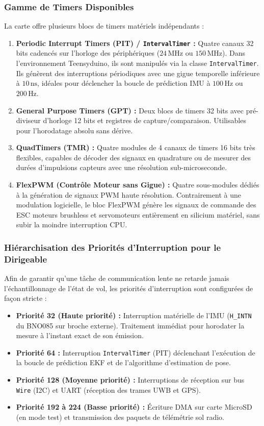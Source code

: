 \documentclass[../Materiel.tex]{subfiles}
\begin{document}
\subsubsection{Gamme de Timers Disponibles}
La carte offre plusieurs blocs de timers matériels indépendants :
\begin{enumerate}
    \item \textbf{Periodic Interrupt Timers (PIT) / \texttt{IntervalTimer} :}
    Quatre canaux 32 bits cadencés sur l'horloge des périphériques ($24\,\text{MHz}$ ou $150\,\text{MHz}$). Dans l'environnement Teensyduino, ils sont manipulés via la classe \lstinline|IntervalTimer|. Ils génèrent des interruptions périodiques avec une gigue temporelle inférieure à $10\,\text{ns}$, idéales pour déclencher la boucle de prédiction IMU à $100\,\text{Hz}$ ou $200\,\text{Hz}$.
    \item \textbf{General Purpose Timers (GPT) :}
    Deux blocs de timers 32 bits avec pré-diviseur d'horloge 12 bits et registres de capture/comparaison. Utilisables pour l'horodatage absolu sans dérive.
    \item \textbf{QuadTimers (TMR) :}
    Quatre modules de 4 canaux de timers 16 bits très flexibles, capables de décoder des signaux en quadrature ou de mesurer des durées d'impulsions capteurs avec une résolution sub-microseconde.
    \item \textbf{FlexPWM (Contrôle Moteur sans Gigue) :}
    Quatre sous-modules dédiés à la génération de signaux PWM haute résolution. Contrairement à une modulation logicielle, le bloc FlexPWM génère les signaux de commande des ESC moteurs brushless et servomoteurs entièrement en silicium matériel, sans subir la moindre interruption CPU.
\end{enumerate}

\subsubsection{Hiérarchisation des Priorités d'Interruption pour le Dirigeable}
Afin de garantir qu'une tâche de communication lente ne retarde jamais l'échantillonnage de l'état de vol, les priorités d'interruption sont configurées de façon stricte :
\begin{itemize}
    \item \textbf{Priorité 32 (Haute priorité) :} Interruption matérielle de l'IMU (\lstinline|H_INTN| du BNO085 sur broche externe). Traitement immédiat pour horodater la mesure à l'instant exact de son émission.
    \item \textbf{Priorité 64 :} Interruption \lstinline|IntervalTimer| (PIT) déclenchant l'exécution de la boucle de prédiction EKF et de l'algorithme d'estimation de pose.
    \item \textbf{Priorité 128 (Moyenne priorité) :} Interruptions de réception sur bus \texttt{Wire} (I2C) et UART (réception des trames UWB et GPS).
    \item \textbf{Priorité 192 à 224 (Basse priorité) :} Écriture DMA sur carte MicroSD (en mode test) et transmission des paquets de télémétrie sol radio.
\end{itemize}
\end{document}

